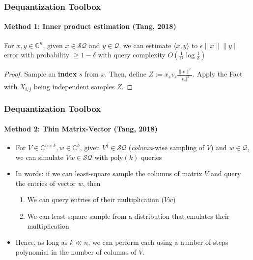 \documentclass{beamer}
\newcommand\0{\mathbf{0}}
\newcommand\CC{\mathbb{C}}
\newcommand\<{\langle}
\renewcommand\>{\rangle}
\begin{document}
\begin{frame}
\frametitle{Dequantization Toolbox}
\framesubtitle{Method 1: Inner product estimation (Tang, 2018)}
\begin{corollary} For $x,y \in\CC^n$, given $x \in \mathcal{SQ}$ and $y \in \mathcal{Q}$, we can estimate $\langle x,y\rangle$ to $\epsilon\|x\|\|y\|$ error with probability $\geq 1-\delta$ with query complexity $O(\frac{1}{\epsilon^2}\log\frac{1}{\delta})$
\end{corollary}
\pause
\begin{proof}Sample an \textbf{index} $s$ from $x$. Then, define $Z := x_s v_s\frac{\|v\|^2}{|v_s|^2}$. Apply the Fact with $X_{i,j}$ being independent samples $Z$.
\end{proof}	
\end{frame}

\begin{frame}
\frametitle{Dequantization Toolbox}
\framesubtitle{Method 2: Thin Matrix-Vector (Tang, 2018)}
\begin{itemize}
	\item For $V \in \CC^{n\times k}, w \in \CC^k$, given $V^\dagger \in \mathcal{SQ}$ (\textit{column}-wise sampling of $V$) and $w \in \mathcal{Q}$, we can simulate $Vw \in \mathcal{SQ}$ with $\text{poly}(k)$ queries
	\item In words: if we can least-square sample the columns of matrix $V$ and query the entries of vector $w$, then
\begin{enumerate}
\item  We can query entries of their multiplication ($Vw$) 
\item We can least-square sample from a distribution that emulates their multiplication	
\end{enumerate}

\item Hence, as long as $k \ll n$, we can perform  each using a number of steps polynomial in the number of columns of $V$. 

\end{itemize}
\end{frame}
\end{document}
